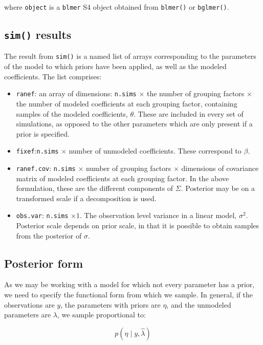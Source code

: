 \documentclass[10pt]{article}
\newcommand{\code}[1]{\texttt{#1}}
\begin{document}
\noindent where \code{object} is a \code{blmer} S4 object obtained
from \code{blmer()} or \code{bglmer()}.

\subsection[sim() results]{\code{sim()} results}

The result from \code{sim()} is a named list of arrays corresponding to the
parameters of the model to which priors have been applied, as well as
the modeled coefficients. The list comprises:

\begin{itemize}
\item \code{ranef}: an array of dimensions: \code{n.sims} $\times$ the number of grouping factors $\times$
  the number of modeled coefficients at each grouping factor, containing samples of the modeled coefficients, $\theta$. These are included in every set
  of simulations, as opposed to the other parameters which are only
  present if a prior is specified.
\item \code{fixef}:\code{n.sims} $\times$ number of unmodeled
  coefficients. These correspond to $\beta$.
\item \code{ranef.cov}: \code{n.sims} $\times$ number of grouping
  factors $\times$ dimensions of covariance matrix of modeled
  coefficients at each grouping factor. In the above formulation,
  these are the different components of $\Sigma$. Posterior may be on
  a transformed scale if a decomposition is used.
\item \code{obs.var}: \code{n.sims} $\times 1$. The observation level
  variance in a linear model, $\sigma^2$. Posterior scale depends on
  prior scale, in that it is possible to obtain samples from the
  posterior of $\sigma$.
\end{itemize}

\subsection{Posterior form}

As we may be working with a model for which not every parameter has a
prior, we need to specify the functional form from which we
sample. In general, if the observations are $y$, the parameters with
priors are $\eta$, and the unmodeled parameters are $\lambda$, we
sample proportional to:

\begin{equation*}
p(\eta \mid y, \hat{\lambda})
\end{equation*}
\end{document}
